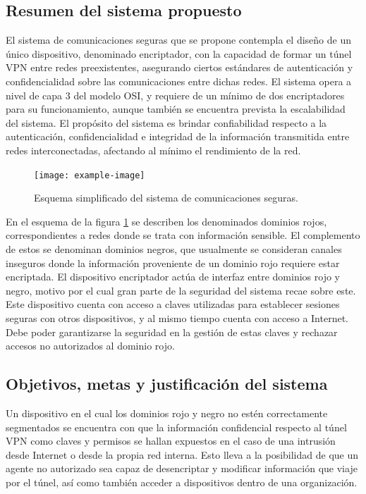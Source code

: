 \subsection{Resumen del sistema propuesto}

El sistema de comunicaciones seguras que se propone contempla el diseño de un único dispositivo, denominado encriptador, con la capacidad de formar un túnel VPN entre redes preexistentes, asegurando ciertos estándares de autenticación y confidencialidad sobre las comunicaciones entre dichas redes. El sistema opera a nivel de capa 3 del modelo OSI, y requiere de un mínimo de dos encriptadores para su funcionamiento, aunque también se encuentra prevista la escalabilidad del sistema.
El propósito del sistema es brindar confiabilidad respecto a la autenticación, confidencialidad e integridad de la información transmitida entre redes interconectadas,  afectando al mínimo el rendimiento de la red.

\begin{figure}[h!]
    \centering    
    \texttt{[image: example-image]}
    \caption{Esquema simplificado del sistema de comunicaciones seguras.}
    \label{fig:overview}
\end{figure}

En el esquema de la figura \ref{fig:overview} se describen los denominados dominios rojos, correspondientes a redes donde se trata con información sensible. El complemento de estos se denominan dominios negros, que usualmente se consideran canales inseguros donde la información proveniente de un dominio rojo requiere estar encriptada. 
El dispositivo encriptador actúa de interfaz entre dominios rojo y negro, motivo por el cual gran parte de la seguridad del sistema recae sobre este. Este dispositivo cuenta con acceso a claves utilizadas para establecer sesiones seguras con otros dispositivos, y al mismo tiempo cuenta con acceso a Internet. Debe poder garantizarse la seguridad en la gestión de estas claves y rechazar accesos no autorizados al dominio rojo.

\clearpage

\subsection{Objetivos, metas y justificación del sistema}

Un dispositivo en el cual los dominios rojo y negro no estén correctamente segmentados se encuentra con que la información confidencial respecto al túnel VPN como claves y permisos se hallan expuestos en el caso de una intrusión desde Internet o desde la propia red interna. Esto lleva a la posibilidad de que un agente no autorizado sea capaz de desencriptar y modificar información que viaje por el túnel, así como también acceder a dispositivos dentro de una organización.

